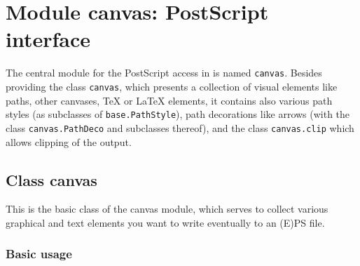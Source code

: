 \chapter{Module canvas: PostScript interface}
\label{chap:canvas}

\label{canvas}

The central module for the PostScript access in \PyX{} is named
\verb|canvas|. Besides providing the class \verb|canvas|, which
presents a collection of visual elements like paths, other canvases,
\TeX{} or \LaTeX{} elements, it contains also various path styles (as
subclasses of \texttt{base.PathStyle}), path decorations like arrows
(with the class \texttt{canvas.PathDeco} and subclasses thereof), and
the class \texttt{canvas.clip} which allows clipping of the output.


\section{Class canvas}

This is the basic class of the canvas module, which serves to collect
various graphical and text elements you want to write eventually to an 
(E)PS file. 

\subsection{Basic usage}


